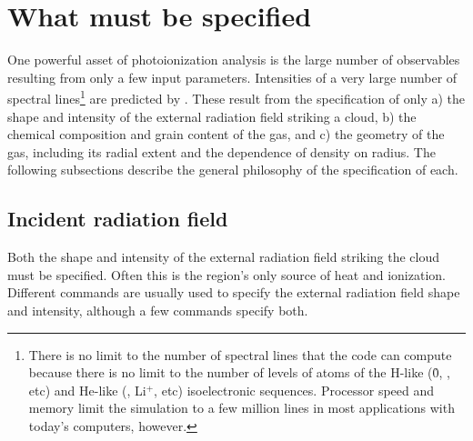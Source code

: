 \section{What must be specified}

\noindent
One powerful asset of photoionization analysis is the large number of
observables resulting from only a few input parameters.
Intensities of a very large number of spectral lines\footnote{
There is no limit to the number of spectral lines that the code can
compute because there is no limit to the number of levels of atoms of the
H-like (\h0, \heplus, etc) and He-like (, Li$^+$, etc)
isoelectronic sequences.
Processor speed and memory limit the simulation to a few million lines in
most applications with today's computers, however.}
are predicted by \Cloudy.  These result
from the specification of only a) the shape and intensity of the external
radiation field striking a cloud,
b) the chemical composition and grain content of the gas, and c) the geometry
of the gas, including its radial extent and the dependence of density on
radius.  The following subsections describe the general philosophy of the
specification of each.

\subsection{Incident radiation field}

\noindent Both the shape and intensity of the external radiation field striking the cloud
must be specified.
Often this is the region's only source of heat and
ionization.
Different commands are usually used to specify the external radiation field
shape and intensity, although a few commands specify both.

